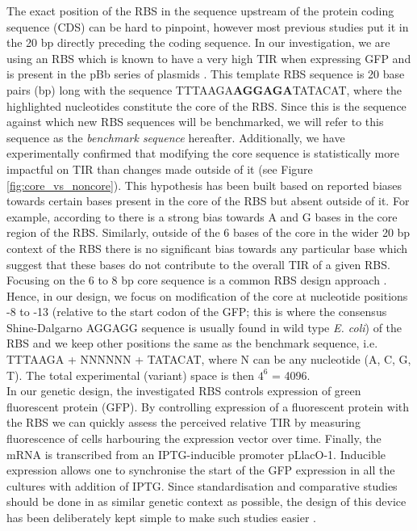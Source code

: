 \documentclass{article}
\begin{document}
The exact position of the RBS in the sequence upstream of the protein coding sequence (CDS) can be hard to pinpoint, however most previous studies put it in the 20 bp directly preceding the coding sequence.
In our investigation, we are using an RBS which is known to have a very high TIR when expressing GFP and is present in the pBb series of plasmids \cite{Lee2011}.
This template RBS sequence is 20 base pairs (bp) long with the sequence TTTAAGA\textbf{AGGAGA}TATACAT, where the highlighted nucleotides constitute the core of the RBS.
Since this is the sequence against which new RBS sequences will be benchmarked,
we will refer to this sequence as the \textit{benchmark sequence} hereafter.
Additionally, we have experimentally confirmed that modifying the core sequence is statistically more impactful on TIR than changes made outside of it (see Figure \ref{fig:core_vs_noncore}).
This hypothesis has been built based on reported biases towards certain bases present in the core of the RBS but absent outside of it.
For example, according to \cite{SHULTZABERGER2001} there is a strong bias towards A and G bases in the core region of the RBS.
Similarly, outside of the 6 bases of the core in the wider 20 bp context of the RBS there is no significant bias towards any particular base which suggest that these bases do not contribute to the overall TIR of a given RBS.
Focusing on the 6 to 8 bp core sequence is a common RBS design approach \cite{Jeschek2016}.
Hence, in our design, we focus on modification of the core at nucleotide positions -8 to -13 (relative to the start codon of the GFP; this is where the consensus Shine-Dalgarno AGGAGG sequence is usually found in wild type \textit{E. coli}) of the RBS and we keep other positions the same as the benchmark sequence, i.e. TTTAAGA + NNNNNN + TATACAT, where N can be any nucleotide (A, C, G, T).
The total experimental (variant) space is then $4^6$ = 4096.\\

In our genetic design, the investigated RBS controls expression of green fluorescent protein (GFP).
By controlling expression of a fluorescent protein with the RBS we can quickly assess the perceived relative TIR by measuring fluorescence of cells harbouring the expression vector over time.
Finally, the mRNA is transcribed from an IPTG-inducible promoter pLlacO-1.
Inducible expression allows one to synchronise the start of the GFP expression in all the cultures with addition of IPTG.
Since standardisation and comparative studies should be done in as similar genetic context as possible, the design of this device has been deliberately kept simple to make such studies easier \cite{Beal2021}.\\
\end{document}
